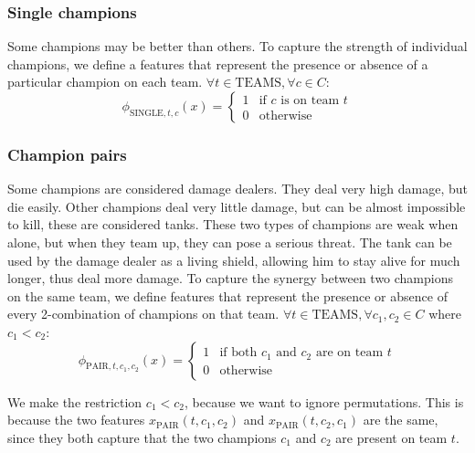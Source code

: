 \subsubsection{Single champions}
Some champions may be better than others. To capture the strength of individual champions, we define a features that represent the presence or absence of a particular champion on each team.
$\forall t \in \text{TEAMS}, \forall c \in C:$
\begin{equation}\label{eq:single}  
\phi_{\text{SINGLE}, t, c}(x) = 
\begin{cases} 
  1 & \text{if } c \text{ is on team } t\\
  0 & \text{otherwise} 
\end{cases}
\end{equation}

\subsubsection{Champion pairs}
Some champions are considered damage dealers. They deal very high damage, but die easily. Other champions deal very little damage, but can be almost impossible to kill, these are considered tanks. These two types of champions are weak when alone, but when they team up, they can pose a serious threat. The tank can be used by the damage dealer as a living shield, allowing him to stay alive for much longer, thus deal more damage.
To capture the synergy between two champions on the same team, we define features that represent the presence or absence of every 2-combination of champions on that team. $\forall t \in \text{TEAMS}, \forall c_1, c_2 \in C$ where $c_1 < c_2$:
\begin{equation}\label{eq:pair}
\phi_{\text{PAIR}, t, c_1, c_2}(x) =
\begin{cases}
  1 & \text{if both } c_1 \text{ and } c_2 \text{ are on team } t\\
  0 & \text{otherwise}
\end{cases}
\end{equation}

We make the restriction $c_1 < c_2$, because we want to ignore permutations. This is because the two features $x_\text{PAIR}(t, c_1, c_2)$ and $x_\text{PAIR}(t, c_2, c_1)$ are the same, since they both capture that the two champions $c_1$ and $c_2$ are present on team $t$.

